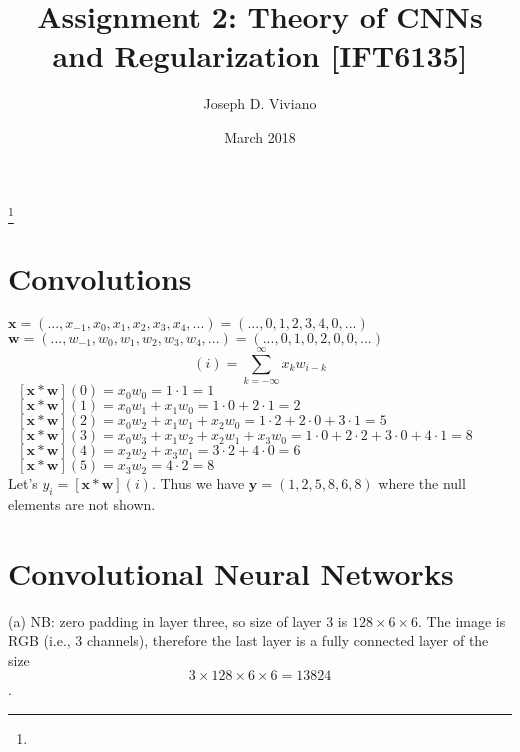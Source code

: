 \documentclass{amsart}
\theoremstyle{definition}
\theoremstyle{remark}
\numberwithin{equation}{section}
\begin{document}
\title{Assignment 2: Theory of CNNs and Regularization [IFT6135]}

\author{Joseph D. Viviano}
\address{Universit\'e de Montr\'eal}
\curraddr{}
\thanks{}
\date{March 2018}

\maketitle


\section{Convolutions}

$\bm{x}=(...,x_{-1}, x_0, x_1,x_2,x_3,x_4,...)
=(...,0,1,2,3,4,0,...)$\\
$\bm{w}=(...,w_{-1}, w_0, w_1,w_2,w_3,w_4,...)
=(...,0,1,0,2,0,0,...)$\\
\begin{equation}
[\bm{x}*\bm{w}](i) =\sum_{k=-\infty}^{\infty}x_{k}w_{i-k}
\end{equation}
$~~~[\bm{x}*\bm{w}](0)=x_0w_0=1\cdot 1=1$\\

$~~~[\bm{x}*\bm{w}](1)=x_0w_1 + x_1w_0 =1\cdot 0 + 2\cdot 1=2$\\

$~~~
[\bm{x}*\bm{w}](2)
= x_0w_2 + x_1w_1 + x_2w_0
= 1\cdot 2 + 2\cdot 0 + 3\cdot 1 =5$\\

$~~~
[\bm{x}*\bm{w}](3)
= x_0w_3 + x_1w_2 + x_2w_1 + x_3w_0
= 1\cdot 0 + 2\cdot 2 + 3\cdot 0 + 4\cdot 1 =8$\\

$~~~
[\bm{x}*\bm{w}](4)
= x_2w_2 + x_3w_1
= 3\cdot 2 + 4\cdot 0 =6$\\

$~~~
[\bm{x}*\bm{w}](5)
= x_3w_2
= 4\cdot 2 =8$\\

Let's $y_i = [\bm{x}*\bm{w}](i)$. Thus we have $\bm{y}=(1,2,5,8,6,8)$ where the null elements are not shown.

\section{Convolutional Neural Networks}

(a) NB: zero padding in layer three, so size of layer 3 is $128 \times6 \times6$.
The image is RGB (i.e., 3 channels), therefore the last layer is a fully
connected layer of the size $$ 3 \times 128 \times 6 \times 6 = 13824$$. \\
\end{document}
